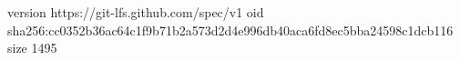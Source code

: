 version https://git-lfs.github.com/spec/v1
oid sha256:cc0352b36ac64c1f9b71b2a573d2d4e996db40aca6fd8ec5bba24598c1dcb116
size 1495
